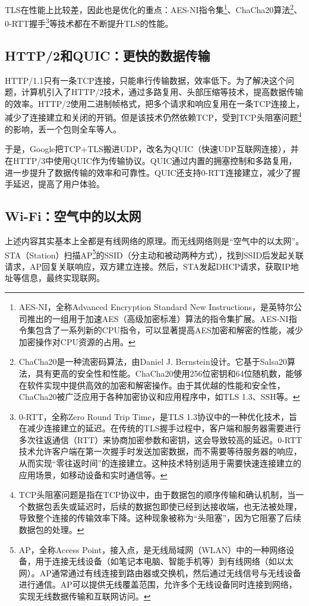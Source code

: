TLS在性能上比较差，因此也是优化的重点：AES-NI指令集\footnote{AES-NI，全称Advanced Encryption Standard New Instructions，是英特尔公司推出的一组用于加速AES（高级加密标准）算法的指令集扩展。AES-NI指令集包含了一系列新的CPU指令，可以显著提高AES加密和解密的性能，减少加密操作对CPU资源的占用。}、ChaCha20算法\footnote{ChaCha20是一种流密码算法，由Daniel J. Bernstein设计。它基于Salsa20算法，具有更高的安全性和性能。ChaCha20使用256位密钥和64位随机数，能够在软件实现中提供高效的加密和解密操作。由于其优越的性能和安全性，ChaCha20被广泛应用于各种加密协议和应用程序中，如TLS 1.3、SSH等。}、0-RTT握手\footnote{0-RTT，全称Zero Round Trip Time，是TLS 1.3协议中的一种优化技术，旨在减少连接建立的延迟。在传统的TLS握手过程中，客户端和服务器需要进行多次往返通信（RTT）来协商加密参数和密钥，这会导致较高的延迟。0-RTT技术允许客户端在第一次握手时发送加密数据，而不需要等待服务器的响应，从而实现“零往返时间”的连接建立。这种技术特别适用于需要快速连接建立的应用场景，如移动设备和实时通信等。}等技术都在不断提升TLS的性能。

\subsection{HTTP/2和QUIC：更快的数据传输}

HTTP/1.1只有一条TCP连接，只能串行传输数据，效率低下。为了解决这个问题，计算机引入了HTTP/2技术，通过多路复用、头部压缩等技术，提高数据传输的效率。HTTP/2使用二进制帧格式，把多个请求和响应复用在一条TCP连接上，减少了连接建立和关闭的开销。但是该技术仍然依赖TCP，受到TCP头阻塞问题\footnote{TCP头阻塞问题是指在TCP协议中，由于数据包的顺序传输和确认机制，当一个数据包丢失或延迟时，后续的数据包即使已经到达接收端，也无法被处理，导致整个连接的传输效率下降。这种现象被称为“头阻塞”，因为它阻塞了后续数据包的处理。}的影响，丢一个包则全车等人。

于是，Google把TCP+TLS搬进UDP，改名为QUIC（快速UDP互联网连接），并在HTTP/3中使用QUIC作为传输协议。QUIC通过内置的拥塞控制和多路复用，进一步提升了数据传输的效率和可靠性。QUIC还支持0-RTT连接建立，减少了握手延迟，提高了用户体验。

\subsection{Wi-Fi：空气中的以太网}

上述内容其实基本上全都是有线网络的原理。而无线网络则是“空气中的以太网”。STA（Station）扫描AP\footnote{AP，全称Access Point，接入点，是无线局域网（WLAN）中的一种网络设备，用于连接无线设备（如笔记本电脑、智能手机等）到有线网络（如以太网）。AP通常通过有线连接到路由器或交换机，然后通过无线信号与无线设备进行通信。AP可以提供无线覆盖范围，允许多个无线设备同时连接到网络，实现无线数据传输和互联网访问。}的SSID（分主动和被动两种方式），找到SSID后发起关联请求，AP回复关联响应，双方建立连接。然后，STA发起DHCP请求，获取IP地址等信息，最终实现联网。

